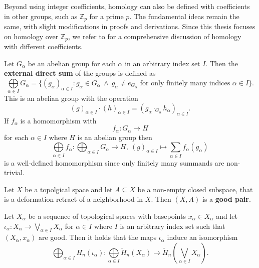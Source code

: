 Beyond using integer coefficients, homology can also be defined with coefficients in other groups, such as \( \mathbb{Z}_p \) for a prime \( p \). The fundamental ideas remain the same, with slight modifications in proofs and derivations. Since this thesis focuses on homology over \( \mathbb{Z}_p \), we refer to \cite[p.~153ff.]{hatcher} for a comprehensive discussion of homology with different coefficients.

\begin{defin}
  Let $G_\alpha$ be an abelian group for each $\alpha$ in an arbitrary index set $I$. Then the \textbf{external direct sum} of the groups is defined as
  \begin{equation*}
    \bigoplus\limits_{\alpha \in I}G_\alpha = \{(g_\alpha)_{\alpha\in I}\colon g_\alpha\in G_\alpha \: \land \: g_\alpha \neq e_{G_\alpha} \text{ for only finitely many indices } \alpha \in I\}.
  \end{equation*}
  This is an abelian group with the operation \[(g)_{\alpha \in I} \cdot (h)_{\alpha\in I} = (g_\alpha \cdot_{G_\alpha} h_\alpha)_{\alpha \in I}.\]
  If $f_\alpha$ is a homomorphism with \[f_\alpha\colon G_\alpha \to H\]  for each $\alpha \in I$ where $H$ is an abelian group then
  \begin{equation*}
    \bigoplus\limits_{\alpha\in I}f_\alpha\colon \bigoplus_{\alpha \in I} G_\alpha\to H,\: (g)_{\alpha \in I} \mapsto \sum\limits_{\alpha \in I}f_\alpha(g_\alpha)
  \end{equation*}
  is a well-defined homomorphism since only finitely many summands are non-trivial.
\end{defin}

\begin{defin}
  Let $X$ be a topolgical space and let $A \subseteq X$ be a non-empty closed subspace, that is a deformation retract of a neighborhood in $X$. Then $(X, A)$ is a \textbf{good pair}.
\end{defin}

\begin{lemma}\label{lem:holwe}
  Let $X_\alpha$ be a sequence of topological spaces with basepoints $x_\alpha\in X_\alpha$ and let $\iota_\alpha\colon X_\alpha \to \bigvee\limits_{\alpha \in I}X_\alpha$ for $\alpha \in I$ where $I$ is an arbitrary index set such that $(X_\alpha, x_\alpha)$ are good. Then it holds that the maps $\iota_\alpha$ induce an isomorphism
  \begin{equation*}
    \bigoplus_{\alpha \in I}H_n(\iota_\alpha) \colon \bigoplus\limits_{\alpha\in I} \tilde{H}_n(X_\alpha)\to \tilde{H}_n\left(\bigvee\limits_{\alpha\in I} X_\alpha\right).
  \end{equation*}
\end{lemma}

